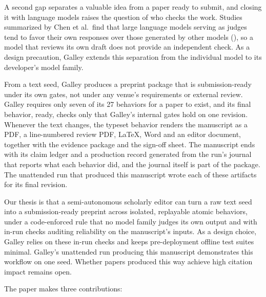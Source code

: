 \documentclass[
]{article}
\begin{document}
A second gap separates a valuable idea from a paper ready to submit, and
closing it with language models raises the question of who checks the
work. Studies summarized by Chen et al.~find that large language models
serving as judges tend to favor their own responses over those generated
by other models (), so a
model that reviews its own draft does not provide an independent check.
As a design precaution, Galley extends this separation from the
individual model to its developer's model family.

From a text seed, Galley produces a preprint package that is
submission-ready under its own gates, not under any venue's requirements
or external review. Galley requires only seven of its 27 behaviors for a
paper to exist, and its final behavior, ready, checks only that Galley's
internal gates hold on one revision. Whenever the text changes, the
typeset behavior renders the manuscript as a PDF, a line-numbered review
PDF, LaTeX, Word and an editor document, together with the evidence
package and the sign-off sheet. The manuscript ends with its claim
ledger and a production record generated from the run's journal that
reports what each behavior did, and the journal itself is part of the
package. The unattended run that produced this manuscript wrote each of
these artifacts for its final revision.

Our thesis is that a semi-autonomous scholarly editor can turn a raw
text seed into a submission-ready preprint across isolated, replayable
atomic behaviors, under a code-enforced rule that no model family judges
its own output and with in-run checks auditing reliability on the
manuscript's inputs. As a design choice, Galley relies on these in-run
checks and keeps pre-deployment offline test suites minimal. Galley's
unattended run producing this manuscript demonstrates this workflow on
one seed. Whether papers produced this way achieve high citation impact
remains open.

The paper makes three contributions:
\end{document}
